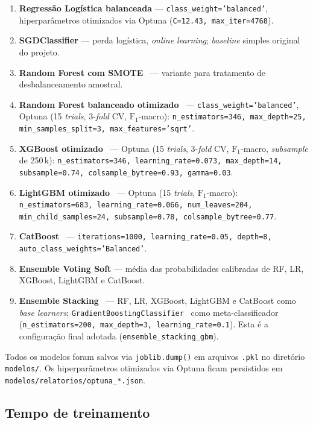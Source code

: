\begin{enumerate}
  \item \textbf{Regressão Logística balanceada} --- \texttt{class\_weight='balanced'}, hiperparâmetros otimizados via Optuna (\texttt{C=12.43, max\_iter=4768}).
  \item \textbf{SGDClassifier} --- perda logística, \emph{online learning}; \emph{baseline} simples original do projeto.
  \item \textbf{Random Forest com SMOTE}~\cite{chawla2002smote} --- variante para tratamento de desbalanceamento amostral.
  \item \textbf{Random Forest balanceado otimizado}~\cite{breiman2001random} --- \texttt{class\_weight='balanced'}, Optuna (15 \emph{trials}, 3-\emph{fold} CV, \(\text{F}_1\)-macro): \texttt{n\_estimators=346, max\_depth=25, min\_samples\_split=3, max\_features='sqrt'}.
  \item \textbf{XGBoost otimizado}~\cite{chen2016xgboost} --- Optuna (15 \emph{trials}, 3-\emph{fold} CV, \(\text{F}_1\)-macro, \emph{subsample} de 250\,k): \texttt{n\_estimators=346, learning\_rate=0.073, max\_depth=14, subsample=0.74, colsample\_bytree=0.93, gamma=0.03}.
  \item \textbf{LightGBM otimizado}~\cite{ke2017lightgbm} --- Optuna (15 \emph{trials}, \(\text{F}_1\)-macro): \texttt{n\_estimators=683, learning\_rate=0.066, num\_leaves=204, min\_child\_samples=24, subsample=0.78, colsample\_bytree=0.77}.
  \item \textbf{CatBoost}~\cite{prokhorenkova2018catboost} --- \texttt{iterations=1000, learning\_rate=0.05, depth=8, auto\_class\_weights='Balanced'}.
  \item \textbf{Ensemble Voting Soft} --- média das probabilidades calibradas de RF, LR, XGBoost, LightGBM e CatBoost.
  \item \textbf{Ensemble Stacking}~\cite{wolpert1992stacked} --- RF, LR, XGBoost, LightGBM e CatBoost como \emph{base learners}; \texttt{GradientBoostingClassifier}~\cite{friedman2001greedy} como meta-classificador (\texttt{n\_estimators=200, max\_depth=3, learning\_rate=0.1}). Esta é a configuração final adotada (\texttt{ensemble\_stacking\_gbm}).
\end{enumerate}

Todos os modelos foram salvos via \texttt{joblib.dump()} em arquivos \texttt{.pkl} no diretório \texttt{modelos/}. Os hiperparâmetros otimizados via Optuna ficam persistidos em \texttt{modelos/relatorios/optuna\_*.json}.

\subsection{Tempo de treinamento}

